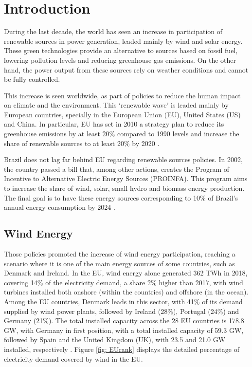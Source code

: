 
\chapter[Introduction]{Introduction}
\label{ch: Intro}

During the last decade, the world has seen an increase in participation of renewable sources in power generation, leaded mainly by wind and solar energy. These green technologies provide an alternative to sources based on fossil fuel, lowering pollution levels and reducing greenhouse gas emissions. On the other hand, the power output from these sources rely on weather conditions and cannot be fully controlled.

This increase is seen worldwide, as part of policies to reduce the human impact on climate and the environment. This `renewable wave' is leaded mainly by European countries, specially in the European Union (EU), United States (US) and China. In particular, EU has set in 2010 a strategy plan to reduce its greenhouse emissions by at least 20\% compared to 1990 levels and increase the share of renewable sources to at least 20\% by 2020 \cite{Europe2020}.

Brazil does not lag far behind EU regarding renewable sources policies. In 2002, the country passed a bill that, among other actions, creates the Program of Incentive to Alternative Electric Energy Sources (PROINFA). This program aims to increase the share of wind, solar, small hydro and biomass energy production. The final goal is to have these energy sources corresponding to 10\% of Brazil's annual energy consumption by 2024 \cite{Brazil2002}.

\section{Wind Energy}

Those policies promoted the increase of wind energy participation, reaching a scenario where it is one of the main energy sources of some countries, such as Denmark and Ireland. In the EU, wind energy alone generated 362 TWh in 2018, covering 14\% of the electricity demand, a share 2\% higher than 2017, with wind turbines installed both onshore (within the countries) and offshore (in the ocean). Among the EU countries, Denmark leads in this sector, with 41\% of its demand supplied by wind power plants, followed by Ireland (28\%), Portugal (24\%) and Germany (21\%). The total installed capacity across the 28 EU countries is 178.8 GW, with Germany in first position, with a total installed capacity of 59.3 GW, followed by Spain and the United Kingdom (UK), with 23.5 and 21.0 GW installed, respectively \cite{WindEurope2019}. Figure \ref{fig: EUrank} displays the detailed percentage of electricity demand covered by wind in the EU.


